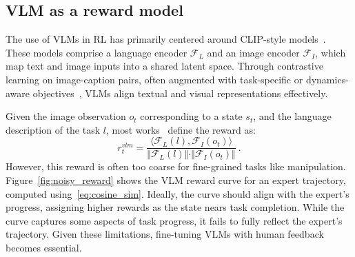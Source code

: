 \subsection{VLM as a reward model} \label{sec:vlm}
The use of VLMs in RL has primarily centered around CLIP-style models~\cite{radford2021learning}. These models comprise a language encoder $\mathcal{F}_L$ and an image encoder $\mathcal{F}_I$, which map text and image inputs into a shared latent space. Through contrastive learning on image-caption pairs, often augmented with task-specific or dynamics-aware objectives~\cite{ma2023liv}, VLMs align textual and visual representations effectively.

Given the image observation $o_t$ corresponding to a state $s_t$, and the language description of the task $l$, most works~\cite{mahmoudieh2022zero,adeniji2023language,fu2024furl} define the reward as:
\begin{equation}
\label{eq:cosine_sim}
    r^{vlm}_t = \frac{\langle \mathcal{F}_{L}(l), \mathcal{F}_{I}(o_t) \rangle}{\Vert \mathcal{F}_{L}(l) \Vert \cdot \Vert \mathcal{F}_{I}(o_t) \Vert} \ .
\end{equation}
However, this reward is often too coarse for fine-grained tasks like manipulation. Figure~\ref{fig:noisy_reward} shows the VLM reward curve for an expert trajectory, computed using~\eqref{eq:cosine_sim}. Ideally, the curve should align with the expert’s progress, assigning higher rewards as the state nears task completion. While the curve captures some aspects of task progress, it fails to fully reflect the expert’s trajectory. Given these limitations, fine-tuning VLMs with human feedback becomes essential. 



